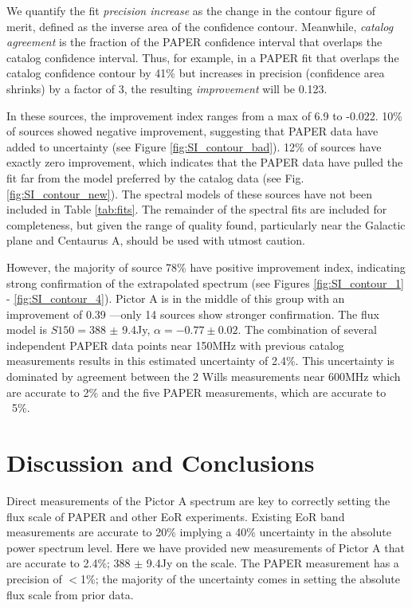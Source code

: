 \documentclass[preprint]{aastex}
\begin{document}
We quantify the fit {\em precision increase} as the change in the contour
figure of merit, defined as the inverse area of the confidence contour.
Meanwhile, {\em catalog agreement} is the fraction of the PAPER confidence
interval that overlaps the catalog confidence interval.  Thus, for example, in
a PAPER fit that overlaps the catalog confidence contour by 41\% but increases
in precision (confidence area shrinks) by a factor of 3, the resulting {\em
improvement} will be 0.123.  

In these sources, the improvement index ranges from a max of 6.9 to -0.022.
10\% of sources showed negative improvement, suggesting that PAPER data have
added to uncertainty (see Figure \ref{fig:SI_contour_bad}). 12\% of sources
have exactly zero improvement, which indicates that the PAPER data have pulled
the fit far from the model preferred by the catalog data (see Fig.
\ref{fig:SI_contour_new}).  The spectral models of these sources have not been
included in Table \ref{tab:fits}.  The remainder of the spectral fits are
included for completeness, but given the range of quality found, particularly
near the Galactic plane and Centaurus A, should be used with utmost caution.

However, the majority of source 78\% have positive improvement index,
indicating strong confirmation of the extrapolated spectrum (see Figures
\ref{fig:SI_contour_1} - \ref{fig:SI_contour_4}).  Pictor A is in the middle of
this group  with an improvement of 0.39 ---only 14 sources show stronger
confirmation.  The flux model is $S150=$388 $\pm$ 9.4Jy, $\alpha=-0.77\pm0.02$.
The combination of several independent PAPER data points near 150MHz with
previous catalog measurements results in this estimated uncertainty of 2.4\%.
This uncertainty is dominated by agreement between the 2 Wills measurements
near 600MHz which are accurate to 2\% and the five PAPER measurements, which
are accurate to ~5\%.


 \section{Discussion and Conclusions}
 \label{sec:Conclusion}
 
Direct measurements of the Pictor A spectrum are key to correctly setting the
flux scale of PAPER and other EoR experiments. Existing EoR band measurements
are accurate to 20\% implying a 40\% uncertainty in the absolute power spectrum
level.  Here we have provided new measurements of Pictor A that are accurate to
2.4\%;  388 $\pm$ 9.4Jy on the \citet{Baars:1977p9678} scale. The PAPER
measurement has a precision of $<$1\%; the majority of the uncertainty comes in
setting the absolute flux scale from prior data.  
\end{document}
